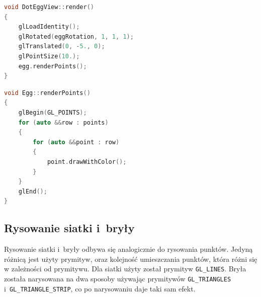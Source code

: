 \begin{lstlisting}[label={lst:anim}, language=C++, caption=Rysowanie jajka z~punktów. Widok \lstinline{DottEggView}]
void DotEggView::render()
{
    glLoadIdentity();
    glRotated(eggRotation, 1, 1, 1);
    glTranslated(0, -5., 0);
    glPointSize(10.);
    egg.renderPoints();
}
\end{lstlisting}
\begin{lstlisting}[language=C++, caption=Rysowanie jajka z~punktów. Model \lstinline{Egg}]
void Egg::renderPoints()
{
    glBegin(GL_POINTS);
    for (auto &&row : points)
    {
        for (auto &&point : row)
        {
            point.drawWithColor();
        }
    }
    glEnd();
}
\end{lstlisting}
\newpage
\subsection{Rysowanie siatki i~bryły}
Rysowanie siatki i~bryły odbywa się analogicznie do rysowania punktów. Jedyną różnicą jest użyty prymityw, oraz kolejność umieszczania punktów, która różni się w zależności od prymitywu. Dla siatki użyty został prymityw \lstinline{GL_LINES}. Bryła została narysowana na dwa sposoby używając prymitywów \lstinline{GL_TRIANGLES} i~\lstinline{GL_TRIANGLE_STRIP}, co po narysowaniu daje taki sam efekt.

